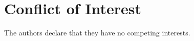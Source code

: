 \documentclass[runningheads,a4paper]{llncs}
\begin{document}
\section*{Conflict of Interest}
The authors declare that they have no competing interests.




\clearpage


%





%
\end{document}
